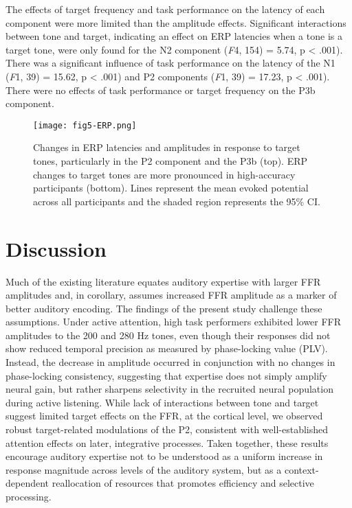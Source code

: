 \documentclass{article}
\begin{document}
The effects of target frequency and task performance on the latency of each component were more limited than the amplitude effects. Significant interactions between tone and target, indicating an effect on ERP latencies when a tone is a target tone, were only found for the N2 component (\textit{F}4, 154) = 5.74, p < .001). There was a significant influence of task performance on the latency of the N1 (\textit{F}1, 39) = 15.62, p < .001) and P2 components (\textit{F}1, 39) = 17.23, p < .001). There were no effects of task performance or target frequency on the P3b component.


\begin{figure}
    \centering
    \texttt{[image: fig5-ERP.png]}
    \caption{Changes in ERP latencies and amplitudes in response to target tones, particularly in the P2 component and the P3b (top). ERP changes to target tones are more pronounced in high-accuracy participants (bottom). Lines represent the mean evoked potential across all participants and the shaded region represents the 95\% CI.}
    \label{Figure 5}
\end{figure}

\section*{Discussion}

Much of the existing literature equates auditory expertise with larger FFR amplitudes and, in corollary, assumes increased FFR amplitude as a marker of better auditory encoding. The findings of the present study challenge these assumptions. Under active attention, high task performers exhibited lower FFR amplitudes to the 200 and 280 Hz tones, even though their responses did not show reduced temporal precision as measured by phase-locking value (PLV). Instead, the decrease in amplitude occurred in conjunction with no changes in phase-locking consistency, suggesting that expertise does not simply amplify neural gain, but rather sharpens selectivity in the recruited neural population during active listening. While lack of interactions between tone and target suggest limited target effects on the FFR, at the cortical level, we observed robust target-related modulations of the P2, consistent with well-established attention effects on later, integrative processes. Taken together, these results encourage auditory expertise not to be understood as a uniform increase in response magnitude across levels of the auditory system, but as a context-dependent reallocation of resources that promotes efficiency and selective processing.
\end{document}
